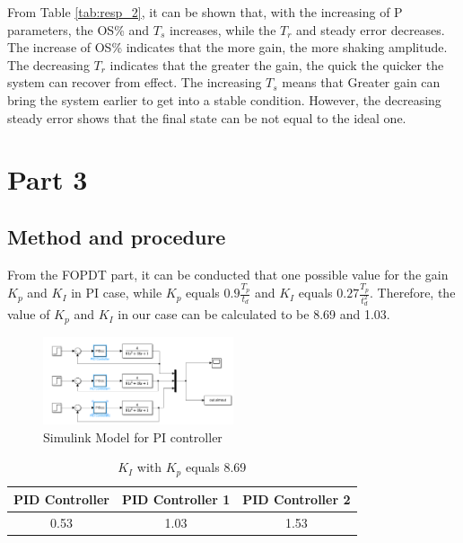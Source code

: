 \documentclass[11pt, a4paper]{article}
\begin{document}
From Table \ref{tab:resp_2}, it can be shown that, with the increasing of P parameters, the OS\% and $T_{s}$ increases, while the $T_{r}$ and steady error decreases. The increase of OS\% indicates that the more gain, the more shaking amplitude. The decreasing $T_{r}$ indicates that the greater the gain, the quick the quicker the system can recover from effect. The increasing $T_{s}$ means that Greater gain can bring the system earlier to get into a stable condition. However, the decreasing steady error shows that the final state can be not equal to the ideal one.


\section{Part 3}

\subsection{Method and procedure}

From the FOPDT part, it can be conducted that one possible value for the gain $K_{p}$ and $K_{I}$ in PI case, while $K_{p}$ equals $0.9\frac{T_{p}}{t_{d}}$ and $K_{I}$ equals $0.27\frac{T_{p}}{t_{d}^2}$. Therefore, the value of $K_{p}$ and $K_{I}$ in our case can be calculated to be 8.69 and 1.03. 

\begin{figure}[htbp]     \begin{centering}
    \includegraphics[width=0.5\textwidth]{p3.png}
    \caption{\label{Fig:p3}Simulink Model for PI controller}
    \end{centering}
    
\end{figure}



\begin{table}[htbp]
\caption{$K_{I}$ with $K_{p}$ equals 8.69}
\label{tab:3_1}
\begin{center}
\begin{tabular}{ccc}
\hline
 PID Controller      & PID Controller 1       & PID Controller 2   \\
\hline
0.53         & 1.03         &  1.53         \\

\hline
\end{tabular}
\end{center}
\end{table}
\end{document}
